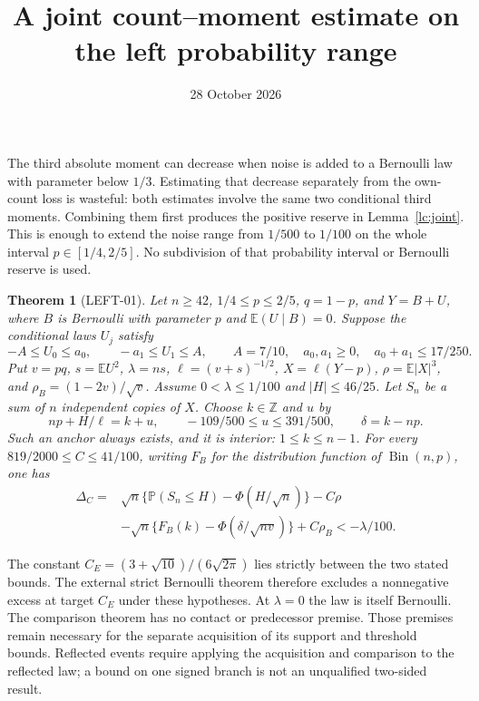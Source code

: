 \documentclass[11pt]{article}
\title{A joint count--moment estimate on the left probability range}
\author{}
\date{28 October 2026}
\newtheorem{theorem}{Theorem}
\newcommand{\E}{\mathbb E}
\newcommand{\Pp}{\mathbb P}
\newcommand{\CE}{C_E}
\begin{document}
\maketitle

The third absolute moment can decrease when noise is added to a Bernoulli
law with parameter below $1/3$. Estimating that decrease separately from
the own-count loss is wasteful: both estimates involve the same two
conditional third moments. Combining them first produces the positive
reserve in Lemma~\ref{lc:joint}. This is enough to extend the noise range
from $1/500$ to $1/100$ on the whole interval $p\in[1/4,2/5]$.
No subdivision of that probability interval or Bernoulli reserve is used.

\begin{theorem}[LEFT-01]\label{lc:main}
Let $n\ge42$, $1/4\le p\le2/5$, $q=1-p$, and $Y=B+U$, where
$B$ is Bernoulli with parameter $p$ and $\E(U\mid B)=0$.
Suppose the conditional laws $U_j$ satisfy
\[
 -A\le U_0\le a_0,\qquad -a_1\le U_1\le A,\qquad
 A=7/10,\quad a_0,a_1\ge0,\quad a_0+a_1\le17/250.
\]
Put $v=pq$, $s=\E U^2$, $\lambda=ns$, $\ell=(v+s)^{-1/2}$,
$X=\ell(Y-p)$, $\rho=\E|X|^3$, and $\rho_B=(1-2v)/\sqrt v$.
Assume $0<\lambda\le1/100$ and $|H|\le46/25$.
Let $S_n$ be a sum of $n$ independent copies of $X$.
Choose $k\in\mathbb Z$ and $u$ by
\[
 np+H/\ell=k+u,\qquad -109/500\le u\le391/500,
 \qquad \delta=k-np.
\]
Such an anchor always exists, and it is interior: $1\le k\le n-1$.
For every $819/2000\le C\le41/100$, writing $F_B$ for the
distribution function of $\operatorname{Bin}(n,p)$, one has
\begin{align*}
 \Delta_C={}&\sqrt n\{\Pp(S_n\le H)-\Phi(H/\sqrt n)\}-C\rho\\
 &-\sqrt n\{F_B(k)-\Phi(\delta/\sqrt{nv})\}+C\rho_B
 <-\lambda/100.
\end{align*}
\end{theorem}

The constant $\CE=(3+\sqrt{10})/(6\sqrt{2\pi})$ lies strictly between
the two stated bounds. The external strict Bernoulli theorem therefore
excludes a nonnegative excess at target $\CE$ under these hypotheses.
At $\lambda=0$ the law is itself Bernoulli. The comparison theorem has
no contact or predecessor premise. Those premises remain necessary for
the separate acquisition of its support and threshold bounds. Reflected
events require applying the acquisition and comparison to the reflected
law; a bound on one signed branch is not an unqualified two-sided result.
\end{document}
